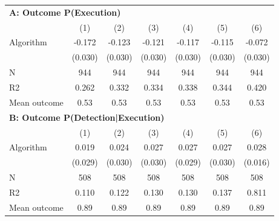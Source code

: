 \begin{tabular}{lcccccc} \toprule
\multicolumn{7}{l}{\textbf{A: Outcome P(Execution)}} \\ \multicolumn{1}{l}{} & (1) & (2) & (3) & (4) & (5) & (6) \\ \midrule
Algorithm   &      -0.172\sym{***}&      -0.123\sym{***}&      -0.121\sym{***}&      -0.117\sym{***}&      -0.115\sym{***}&      -0.072\sym{**} \\
            &     (0.030)         &     (0.030)         &     (0.030)         &     (0.030)         &     (0.030)         &     (0.030)         \\
\midrule
N           &         944         &         944         &         944         &         944         &         944         &         944         \\
R2          &       0.262         &       0.332         &       0.334         &       0.338         &       0.344         &       0.420         \\
Mean outcome&        0.53         &        0.53         &        0.53         &        0.53         &        0.53         &        0.53         \\

\midrule \multicolumn{7}{l}{\textbf{B: Outcome P(Detection|Execution)}} \\ \multicolumn{1}{l}{} & (1) & (2) & (3) & (4) & (5) & (6) \\ \midrule
Algorithm   &       0.019         &       0.024         &       0.027         &       0.027         &       0.027         &       0.028\sym{*}  \\
            &     (0.029)         &     (0.030)         &     (0.030)         &     (0.029)         &     (0.030)         &     (0.016)         \\
\midrule
N           &         508         &         508         &         508         &         508         &         508         &         508         \\
R2          &       0.110         &       0.122         &       0.130         &       0.130         &       0.137         &       0.811         \\
Mean outcome&        0.89         &        0.89         &        0.89         &        0.89         &        0.89         &        0.89         \\


\end{tabular}
